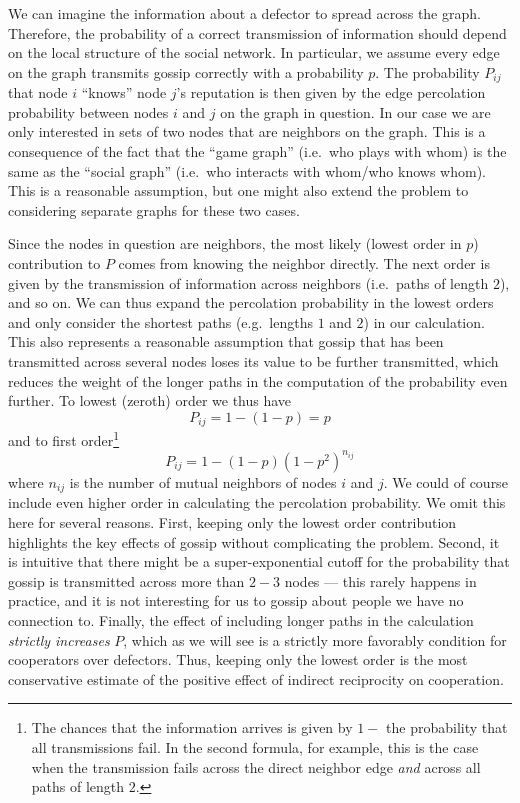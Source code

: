 \documentclass{article}
\renewcommand{\=}[1]{\stackrel{#1}{=}} %
\begin{document}
We can imagine the information about a defector to spread across the graph. Therefore, the probability of a correct
transmission of information should depend on the local structure of the social network. In particular, we assume every edge on the graph transmits gossip correctly with a probability $p$. The probability $P_{ij}$ that node $i$ ``knows''
node $j$'s reputation is then given by the edge percolation probability between nodes $i$ and $j$ on the graph in question. In our case we are only interested in sets of two nodes that are neighbors on the graph. This is a consequence of the fact that the ``game graph'' (i.e.~who plays with whom) is the same as the ``social graph'' (i.e.~who interacts with whom/who knows whom). This is a reasonable assumption, but one might also extend the problem to considering separate graphs for these two cases.

Since the nodes in question are neighbors, the most likely (lowest order in $p$) contribution to $P$ comes from knowing the neighbor directly. The next order is given by the transmission of information across neighbors (i.e.~paths of length $2$), and so on. We can thus expand the percolation probability in the lowest orders and only consider the
shortest paths (e.g.~lengths $1$ and $2$) in our calculation. This also
represents a reasonable assumption that gossip that has been transmitted
across several nodes loses its value to be further transmitted, which
reduces the weight of the longer paths in the computation of the
probability even further. To lowest (zeroth) order we thus have
$$P_{ij} = 1 - (1-p) = p$$
 and to first order\footnote{The chances that the information arrives is given by
$1 - $ the probability that all transmissions fail. In the second
formula, for example, this is the case when the transmission fails
across the direct neighbor edge \emph{and} across all paths of length
$2$.}
$$P_{ij} = 1 - (1-p)(1-p^2)^{n_{ij}}$$
where $n_{ij}$ is the number of mutual neighbors of nodes $i$ and $j$. We could of course include even higher order in calculating the percolation probability. We omit this here for several reasons. First, keeping only the lowest order contribution highlights the key effects of gossip without complicating the problem. Second, it is intuitive that there might be a super-exponential cutoff for the probability that gossip is transmitted across more than $2-3$ nodes --- this rarely happens in practice, and it is not interesting for us to gossip about people we have no connection to. Finally, the effect of including longer paths in the calculation \emph{strictly increases} $P$, which as we will see is a strictly more favorably condition for cooperators over defectors. Thus, keeping only the lowest order is the most conservative estimate of the positive effect of indirect reciprocity on cooperation.
\end{document}

